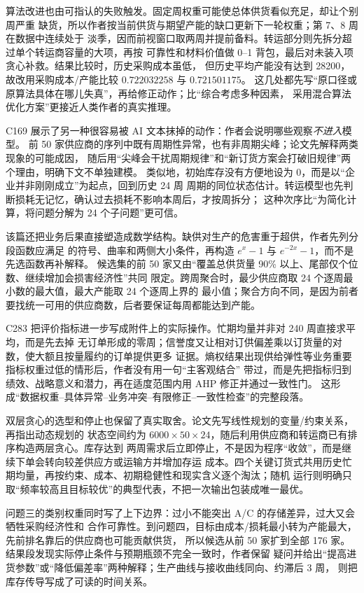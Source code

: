 算法改进也由可指认的失败触发。固定周权重可能使总体供货看似充足，却让个别周严重
缺货，所以作者按当前供货与期望产能的缺口更新下一轮权重；第 7、8 周在数据中连续处于
淡季，因而前视窗口取两周并提前备料。转运部分则先拆分超过单个转运商容量的大项，再按
可靠性和材料价值做 0--1 背包，最后对未装入项贪心补救。结果比较时，历史采购成本虽低，
但历史平均产能没有达到 28200，故改用采购成本/产能比较 $0.722032258$ 与 $0.721501175$。
这几处都先写“原口径或原算法具体在哪儿失真”，再给修正动作；比“综合考虑多种因素，
采用混合算法优化方案”更接近人类作者的真实推理。

C169 展示了另一种很容易被 AI 文本抹掉的动作：作者会说明哪些观察\emph{不进入}模型。
前 50 家供应商的序列中既有周期性异常，也有非周期尖峰；论文先解释两类现象的可能成因，
随后用“尖峰会干扰周期规律”和“新订货方案会打破旧规律”两个理由，明确下文不单独建模。
类似地，初始库存没有方便地设为 0，而是以“企业并非刚刚成立”为起点，回到历史 24 周
周期的同位状态估计。转运模型也先判断损耗无记忆，确认过去损耗不影响本周后，才按周拆分；
这种次序比“为简化计算，将问题分解为 24 个子问题”更可信。

该篇还把业务后果直接塑造成数学结构。缺供对生产的危害重于超供，作者先列分段函数应满足
的符号、曲率和两侧大小条件，再构造 $e^x-1$ 与 $e^{-2x}-1$，而不是先选函数再补解释。
候选集的前 50 家又由“覆盖总供货量 90\% 以上、尾部仅个位数、继续增加会损害经济性”共同
限定。跨周聚合时，最少供应商取 24 个逐周最小数的最大值，最大产能取 24 个逐周上界的
最小值；聚合方向不同，是因为前者要找统一可用的供应商数，后者要保证每周都能达到产能。

C283 把评价指标进一步写成附件上的实际操作。忙期均量并非对 240 周直接求平均，而是先去掉
无订单形成的零周；信誉度又让相对订供偏差乘以订货量的对数，使大额且按量履约的订单提供更多
证据。熵权结果出现供给弹性等业务重要指标权重过低的情形后，作者没有用一句“主客观结合”
带过，而是先把指标归到绩效、战略意义和潜力，再在适度范围内用 AHP 修正并通过一致性门。
这形成“数据权重--具体异常--业务冲突--有限修正--一致性检查”的完整段落。

双层贪心的选型和停止也保留了真实取舍。论文先写线性规划的变量/约束关系，再指出动态规划的
状态空间约为 $6000\times50\times24$，随后利用供应商和转运商已有排序构造两层贪心。库存达到
两周需求后立即停止，不是因为程序“收敛”，而是继续下单会转向较差供应方或运输方并增加存运
成本。四个关键订货式共用历史忙期均量，再按约束、成本、初期稳健性和现实含义逐个淘汰；随机
运行则明确只取“频率较高且目标较优”的典型代表，不把一次输出包装成唯一最优。

问题三的类别权重同时写了上下边界：过小不能突出 A/C 的存储差异，过大又会牺牲采购经济性和
合作可靠性。到问题四，目标由成本/损耗最小转为产能最大，先前排名靠后的供应商也可能贡献供货，
所以候选从前 50 家扩到全部 176 家。结果段发现实际停止条件与预期瓶颈不完全一致时，作者保留
疑问并给出“提高进货参数”或“降低偏差率”两种解释；生产曲线与接收曲线同向、约滞后 3 周，
则把库存传导写成了可读的时间关系。

